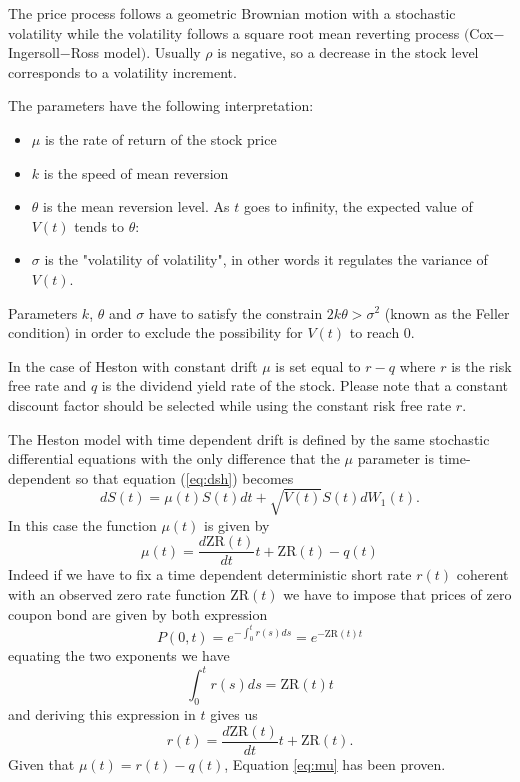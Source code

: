 The price process follows a geometric Brownian motion with a stochastic volatility while the volatility follows a square root mean reverting process $($Cox$-$Ingersoll$-$Ross model$)$. Usually $\rho$ is negative, so a decrease in the stock level corresponds to a volatility increment. 

The parameters have the following interpretation:
\begin{itemize}
\item $\mu$ is the rate of return of the stock price
\item $k$ is the speed of mean reversion
\item $\theta$ is the mean reversion level. As $t$ goes to infinity, the expected value of $V(t)$ tends to $\theta$:
\item $\sigma$ is the "volatility of volatility", in other words it regulates the variance of $V(t)$.
\end{itemize}

Parameters $k$, $\theta$ and $\sigma$ have to satisfy the constrain $2k\theta>\sigma^2$ (known as the Feller condition) in order to exclude the possibility for $V(t)$ to reach 0.

In the case of Heston with constant drift $\mu$ is set equal to $r-q$ where $r$ is the risk free rate and $q$ is the dividend yield rate of the stock. 
Please note that a constant discount factor should be selected while using the constant risk free rate $r$.

The Heston model with time dependent drift is defined by the same stochastic differential equations with the only difference that the $\mu$ parameter is time-dependent so that equation (\ref{eq:dsh}) becomes
\begin{equation}
dS(t) = \mu(t) S(t)dt + \sqrt{V(t)}S(t)dW_1(t).
\end{equation}
In this case the function $\mu(t)$ is given by
\begin{equation}\label{eq:mu}
\mu(t) = \frac{d\mathrm{ZR}(t)}{dt}t + \mathrm{ZR}(t) - q(t)
\end{equation}
Indeed if we have to fix a time dependent deterministic short rate $r(t)$ coherent with an observed zero rate function $\mathrm{ZR}(t)$ we have to impose that prices of zero coupon bond are given by both expression
\begin{equation}
P(0,t) = e^{-\int_0^t r(s)ds} = e^{-\mathrm{ZR}(t)t}
\end{equation}
equating the two exponents we have
\begin{equation}
\int_0^t r(s)ds = \mathrm{ZR}(t)t
\end{equation}
and deriving this expression in $t$ gives us
\begin{equation}
r(t) = \frac{d\mathrm{ZR}(t)}{dt}t + \mathrm{ZR}(t).
\end{equation}
Given that $\mu(t) = r(t) - q(t)$, Equation \ref{eq:mu} has been proven.


